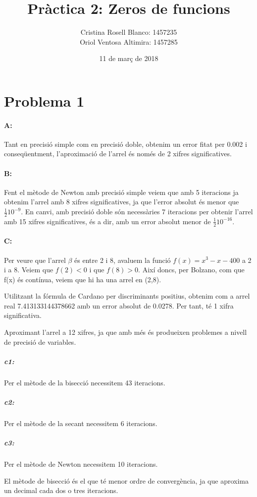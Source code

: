 \documentclass{article}
\title{Pràctica 2: Zeros de funcions}
\author{Cristina Rosell Blanco: 1457235  \\ Oriol Ventosa Altimira: 1457285}
\date{11 de març de 2018}
\begin{document}
	\maketitle
	
	\newpage

	\section{Problema 1}
	\paragraph{A:} Tant en precisió simple com en precisió doble, obtenim un error fitat per 0.002 i conseqüentment, l'aproximació de l'arrel és només de 2 xifres significatives.
	
	\paragraph{B:} Fent el mètode de Newton amb precisió simple veiem que amb 5 iteracions ja obtenim l'arrel amb 8 xifres significatives, ja que l'error absolut és menor que $\frac{1}{2}10^{-9}$. En canvi, amb precisió doble són necessàries 7 iteracions per obtenir l'arrel amb 15 xifres significatives, és a dir, amb un error absolut menor de $\frac{1}{2}10^{-16}$.
	
	\paragraph{C:} Per veure que l'arrel $\beta$ és entre 2 i 8, avaluem la funció $f(x)=x^3-x-400$ a 2 i a 8. Veiem que $f(2)<0$ i que $f(8)>0$. Així doncs, per Bolzano, com que f(x) és contínua, veiem que hi ha una arrel en (2,8). 
	
	Utilitzant la fórmula de Cardano per discriminants positius, obtenim com a arrel real 7.413133144378662 amb un error absolut de 0.0278. Per tant, té 1 xifra significativa.
	
	Aproximant l'arrel a 12 xifres, ja que amb més és produeixen problemes a nivell de precisió de variables.
	
	\subparagraph{c1:} Per el mètode de la bisecció necessitem 43 iteracions.
	\subparagraph{c2:} Per el mètode de la secant necessitem 6 iteracions.
	\subparagraph{c3:} Per el mètode de Newton necessitem 10 iteracions.
	
	El mètode de bisecció és el que té menor ordre de convergència, ja que aproxima un decimal cada dos o tres iteracions.
	
\end{document}
